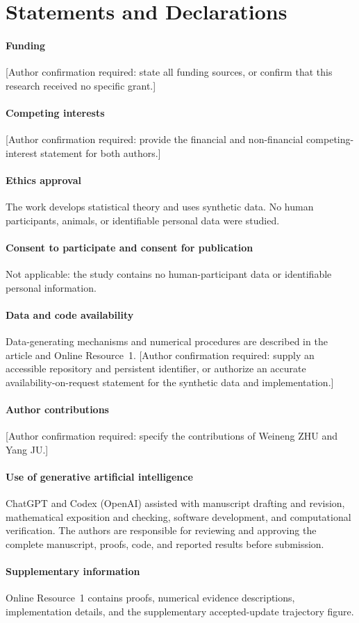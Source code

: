 \providecommand{\DeclarationHeading}{Statements and Declarations}
\section*{\DeclarationHeading}
\paragraph{Funding} [Author confirmation required: state all funding sources, or confirm that this research received no specific grant.]
\paragraph{Competing interests} [Author confirmation required: provide the financial and non-financial competing-interest statement for both authors.]
\paragraph{Ethics approval} The work develops statistical theory and uses synthetic data. No human participants, animals, or identifiable personal data were studied.
\paragraph{Consent to participate and consent for publication} Not applicable: the study contains no human-participant data or identifiable personal information.
\paragraph{Data and code availability} Data-generating mechanisms and numerical procedures are described in the article and Online Resource~1. [Author confirmation required: supply an accessible repository and persistent identifier, or authorize an accurate availability-on-request statement for the synthetic data and implementation.]
\paragraph{Author contributions} [Author confirmation required: specify the contributions of Weineng ZHU and Yang JU.]
\paragraph{Use of generative artificial intelligence} ChatGPT and Codex (OpenAI) assisted with manuscript drafting and revision, mathematical exposition and checking, software development, and computational verification. The authors are responsible for reviewing and approving the complete manuscript, proofs, code, and reported results before submission.
\paragraph{Supplementary information} Online Resource~1 contains proofs, numerical evidence descriptions, implementation details, and the supplementary accepted-update trajectory figure.
